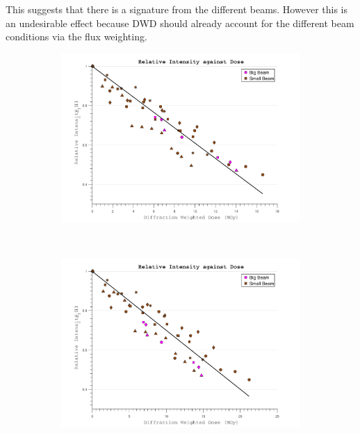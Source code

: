This suggests that there is a signature from the different beams.
However this is an undesirable effect because DWD should already account for the different beam conditions via the flux weighting.
\begin{figure}
	\centering
    \begin{subfigure}[b]{1\textwidth}
        \centering
        \includegraphics[width=\textwidth]{figures/dwd/reproduce_relint_DWDsimple.pdf}
        \caption{}
        \label{fig:Relative intensity - Simple DWD}
    \end{subfigure}
    \\
	\begin{subfigure}[b]{1\textwidth}
        \centering
        \includegraphics[width=\textwidth]{figures/dwd/reproduce_relint_DWDnew.pdf}
        \caption{}
        \label{fig:Relative intensity - Increasing Eta}
    \end{subfigure}
\end{figure}
